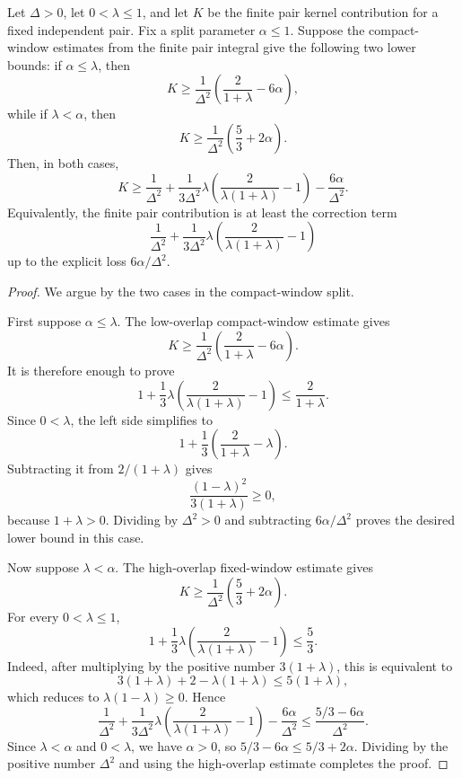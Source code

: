 \begin{helper}
Let $\Delta>0$, let $0<\lambda\le 1$, and let $K$ be the finite pair
kernel contribution for a fixed independent pair.  Fix a split parameter
$\alpha\le 1$.  Suppose the compact-window
estimates from the finite pair integral give the following two lower bounds:
if $\alpha\le\lambda$, then
\[
K\ge
\frac{1}{\Delta^2}\left(\frac{2}{1+\lambda}-6\alpha\right),
\]
while if $\lambda<\alpha$, then
\[
K\ge
\frac{1}{\Delta^2}\left(\frac53+2\alpha\right).
\]
Then, in both cases,
\[
K\ge
\frac{1}{\Delta^2}
+\frac{1}{3\Delta^2}\lambda
\left(\frac{2}{\lambda(1+\lambda)}-1\right)
-\frac{6\alpha}{\Delta^2}.
\]
Equivalently, the finite pair contribution is at least the correction term
\[
\frac{1}{\Delta^2}
+\frac{1}{3\Delta^2}\lambda
\left(\frac{2}{\lambda(1+\lambda)}-1\right)
\]
up to the explicit loss $6\alpha/\Delta^2$.
\end{helper}
\begin{proof}
We argue by the two cases in the compact-window split.

First suppose $\alpha\le\lambda$.  The low-overlap compact-window estimate
gives
\[
K\ge
\frac{1}{\Delta^2}\left(\frac{2}{1+\lambda}-6\alpha\right).
\]
It is therefore enough to prove
\[
1+\frac13\lambda\left(\frac{2}{\lambda(1+\lambda)}-1\right)
\le \frac{2}{1+\lambda}.
\]
Since $0<\lambda$, the left side simplifies to
\[
1+\frac13\left(\frac{2}{1+\lambda}-\lambda\right).
\]
Subtracting it from $2/(1+\lambda)$ gives
\[
\frac{(1-\lambda)^2}{3(1+\lambda)}\ge0,
\]
because $1+\lambda>0$.  Dividing by $\Delta^2>0$ and subtracting
$6\alpha/\Delta^2$ proves the desired lower bound in this case.

Now suppose $\lambda<\alpha$.  The high-overlap fixed-window estimate gives
\[
K\ge
\frac{1}{\Delta^2}\left(\frac53+2\alpha\right).
\]
For every $0<\lambda\le1$,
\[
1+\frac13\lambda\left(\frac{2}{\lambda(1+\lambda)}-1\right)
\le \frac53.
\]
Indeed, after multiplying by the positive number $3(1+\lambda)$, this is
equivalent to
\[
3(1+\lambda)+2-\lambda(1+\lambda)\le 5(1+\lambda),
\]
which reduces to $\lambda(1-\lambda)\ge0$.  Hence
\[
\frac{1}{\Delta^2}
+\frac{1}{3\Delta^2}\lambda
\left(\frac{2}{\lambda(1+\lambda)}-1\right)
-\frac{6\alpha}{\Delta^2}
\le
\frac{5/3-6\alpha}{\Delta^2}.
\]
Since $\lambda<\alpha$ and $0<\lambda$, we have $\alpha>0$, so
$5/3-6\alpha\le 5/3+2\alpha$.  Dividing by the positive number
$\Delta^2$ and using the high-overlap estimate completes the proof.
\end{proof}

